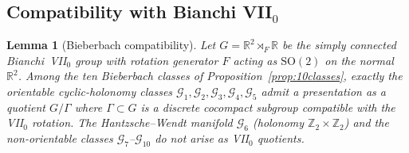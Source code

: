 \documentclass[12pt, a4paper]{article}
\newtheorem{lemma}[theorem]{Lemma}
\theoremstyle{remark}
\newcommand{\bR}{\mathbb{R}}
\newcommand{\bZ}{\mathbb{Z}}
\newcommand{\semidp}{\rtimes}
\begin{document}
\subsection{Compatibility with Bianchi VII$_0$}

\begin{lemma}[Bieberbach compatibility]\label{lem:bieberbach}
  Let $G = \bR^2 \semidp_F \bR$ be the simply connected Bianchi~VII$_0$
  group with rotation generator $F$ acting as $\mathrm{SO}(2)$ on the
  normal $\bR^2$.
  Among the ten Bieberbach classes of Proposition~\ref{prop:10classes},
  exactly the orientable cyclic-holonomy classes
  $\mathcal{G}_1, \mathcal{G}_2, \mathcal{G}_3, \mathcal{G}_4,
  \mathcal{G}_5$ admit a presentation as a quotient $G/\Gamma$ where
  $\Gamma \subset G$ is a discrete cocompact subgroup compatible with the
  VII$_0$ rotation.
  The Hantzsche--Wendt manifold $\mathcal{G}_6$ (holonomy
  $\bZ_2 \times \bZ_2$) and the non-orientable classes
  $\mathcal{G}_7$--$\mathcal{G}_{10}$ do \emph{not} arise as VII$_0$
  quotients.
\end{lemma}
\end{document}

